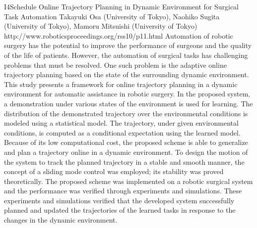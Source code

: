 \begin{spacing}{1.0}
\descriptionPaper
{I4}{Schedule}
{	
Online Trajectory Planning in Dynamic Environment for Surgical Task Automation
}
{
Takayuki Osa (University of Tokyo), Naohiko Sugita (University of Tokyo), Mamoru Mitsuishi (University of Tokyo)
}
{
http://www.roboticsproceedings.org/rss10/p11.html
}
{
Automation of robotic surgery has the potential to improve the performance of surgeons and the quality of the life of patients. However, the automation of surgical tasks has challenging problems that must be resolved. One such problem is the adaptive online trajectory planning based on the state of the surrounding dynamic environment. This study presents a framework for online trajectory planning in a dynamic environment for automatic assistance in robotic surgery. In the proposed system, a demonstration under various states of the environment is used for learning. The distribution of the demonstrated trajectory over the environmental conditions is modeled using a statistical model. The trajectory, under given environmental conditions, is computed as a conditional expectation using the learned model. Because of its low computational cost, the proposed scheme is able to generalize and plan a trajectory online in a dynamic environment. To design the motion of the system to track the planned trajectory in a stable and smooth manner, the concept of a sliding mode control was employed; its stability was proved theoretically. The proposed scheme was implemented on a robotic surgical system and the performance was verified through experiments and simulations. These experiments and simulations verified that the developed system successfully planned and updated the trajectories of the learned tasks in response to the changes in the dynamic environment.
}




\end{spacing}
